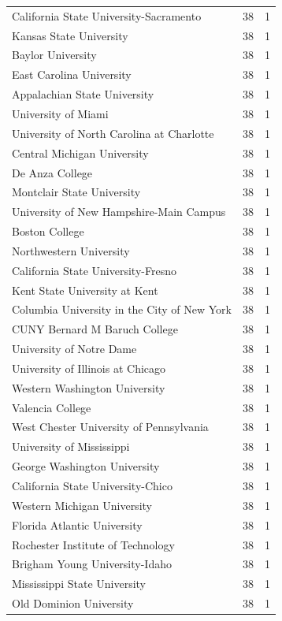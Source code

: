 \documentclass{mcmthesis}
\begin{document}
\begin{appendices}
\begin{tabular}{lcc}
        California State University-Sacramento	&38	&1\\
        Kansas State University	&38&	1\\
        Baylor University	&38&	1\\\hline
        East Carolina University	&38	&1\\
        Appalachian State University	&38	&1\\
        University of Miami	&38	&1\\
        University of North Carolina at Charlotte	&38	&1\\
        Central Michigan University	&38	&1\\
        De Anza College	&38	&1\\
        Montclair State University	&38&	1\\
        University of New Hampshire-Main Campus&	38	&1\\
        Boston College	&38&	1\\
        Northwestern University	&38&	1\\
        California State University-Fresno&	38&	1\\
        Kent State University at Kent	&38	&1\\
        Columbia University in the City of New York	&38&	1\\
        CUNY Bernard M Baruch College	&38&	1\\
        University of Notre Dame	&38	&1\\
        University of Illinois at Chicago	&38	&1\\
        Western Washington University	&38&	1\\
        Valencia College	&38	&1\\
        West Chester University of Pennsylvania	&38	&1\\
        University of Mississippi	&38	&1\\
        George Washington University	&38	&1\\
        California State University-Chico	&38&	1\\
        Western Michigan University&	38	&1\\
        Florida Atlantic University	&38&	1\\
        Rochester Institute of Technology	&38	&1\\
        Brigham Young University-Idaho&	38	&1\\
        Mississippi State University	&38	&1\\
        Old Dominion University	&38	&1\\

\end{tabular}
\end{appendices}
\end{document}
